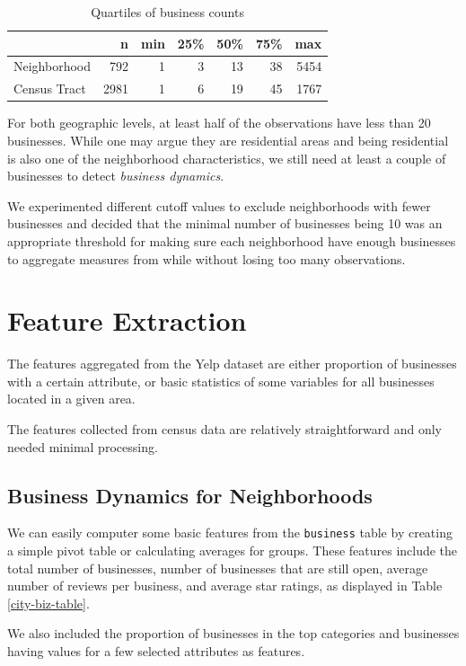 \documentclass[compsoc]{IEEEtran}
\let\MYoriglatexcaption\caption
\renewcommand{\caption}[2][\relax]{\MYoriglatexcaption[#2]{#2}}
\begin{document}
\begin{table}[htbp]
\caption{Quartiles of business counts}
\label{quartiles}
\centering
\begin{tabular}{lr|rrrrr}
\toprule
{} & n & min &  25\% &  50\% &  75\% &    max \\
\midrule
Neighborhood & 792 &  1 &   3 &  13 &  38 &  5454 \\
Census Tract & 2981 &  1 &   6 &  19 &  45 &  1767 \\
\bottomrule
\end{tabular}
\end{table}

For both geographic levels, at least half of the observations have less than 20 businesses. While one may argue they are residential areas and being residential is also one of the neighborhood characteristics, we still need at least a couple of businesses to detect \textit{business dynamics}.

We experimented different cutoff values to exclude neighborhoods with fewer businesses and decided that the minimal number of businesses being 10 was an appropriate threshold for making sure each neighborhood have enough businesses to aggregate measures from while without losing too many observations.

\section{Feature Extraction}

The features aggregated from the Yelp dataset are either proportion of businesses with a certain attribute, or basic statistics of some variables for all businesses located in a given area.

The features collected from census data are relatively straightforward and only needed minimal processing.

\subsection{Business Dynamics for Neighborhoods}

We can easily computer some basic features from the \texttt{business} table by creating a simple pivot table or calculating averages for groups. These features include the total number of businesses, number of businesses that are still open, average number of reviews per business, and average star ratings, as displayed in Table \ref{city-biz-table}.

We also included the proportion of businesses in the top categories and businesses having values for a few selected attributes as features. 
\end{document}
